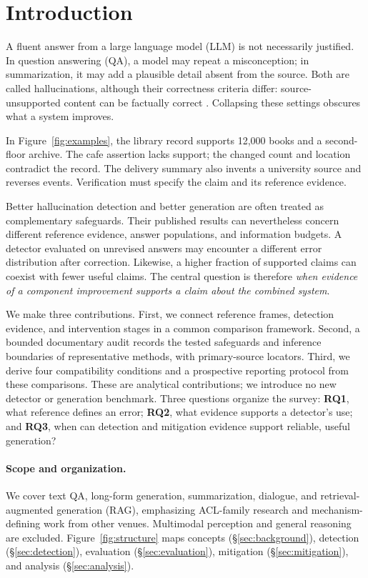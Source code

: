 \section{Introduction}
A fluent answer from a large language model (LLM) is not necessarily justified. In question answering (QA), a model may repeat a misconception; in summarization, it may add a plausible detail absent from the source. Both are called hallucinations, although their correctness criteria differ: source-unsupported content can be factually correct \citep{lin-etal-2022-truthfulqa,cao-etal-2022-hallucinated}. Collapsing these settings obscures what a system improves.


In Figure~\ref{fig:examples}, the library record supports 12,000 books and a second-floor archive. The cafe assertion lacks support; the changed count and location contradict the record. The delivery summary also invents a university source and reverses events. Verification must specify the claim and its reference evidence.

Better hallucination detection and better generation are often treated as complementary safeguards. Their published results can nevertheless concern different reference evidence, answer populations, and information budgets. A detector evaluated on unrevised answers may encounter a different error distribution after correction. Likewise, a higher fraction of supported claims can coexist with fewer useful claims. The central question is therefore \emph{when evidence of a component improvement supports a claim about the combined system}.

We make three contributions. First, we connect reference frames, detection evidence, and intervention stages in a common comparison framework. Second, a bounded documentary audit records the tested safeguards and inference boundaries of representative methods, with primary-source locators. Third, we derive four compatibility conditions and a prospective reporting protocol from these comparisons. These are analytical contributions; we introduce no new detector or generation benchmark. Three questions organize the survey: \textbf{RQ1}, what reference defines an error; \textbf{RQ2}, what evidence supports a detector's use; and \textbf{RQ3}, when can detection and mitigation evidence support reliable, useful generation?

\paragraph{Scope and organization.}
We cover text QA, long-form generation, summarization, dialogue, and retrieval-augmented generation (RAG), emphasizing ACL-family research and mechanism-defining work from other venues. Multimodal perception and general reasoning are excluded. Figure~\ref{fig:structure} maps concepts (\S\ref{sec:background}), detection (\S\ref{sec:detection}), evaluation (\S\ref{sec:evaluation}), mitigation (\S\ref{sec:mitigation}), and analysis (\S\ref{sec:analysis}).

